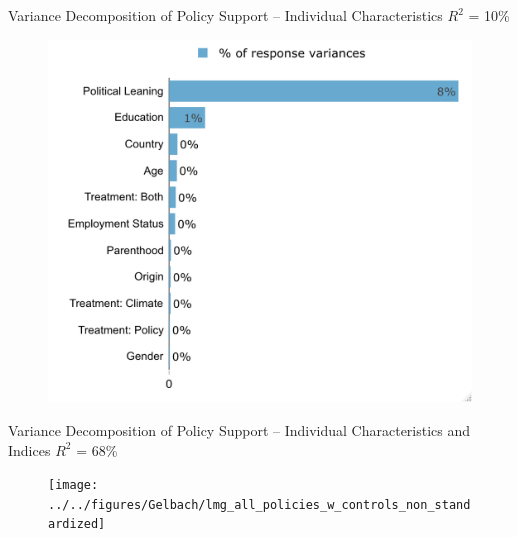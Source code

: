 \begin{frame}{Variance Decomposition of Policy Support -- Individual Characteristics}%
\vspace{-.1cm}
{\footnotesize $R^2$ = 10\%}
\begin{figure}[h!]
\vspace{-.1cm}
\includegraphics[width=.64\textwidth]{../../figures/Gelbach/lmg_all_policies_no_indices_non_standardized} \\
\end{figure}
\end{frame}

\begin{frame}{Variance Decomposition of Policy Support -- Individual Characteristics and Indices}%
\vspace{-.1cm}
{\footnotesize $R^2$ = 68\%}
\begin{figure}[h!]
\vspace{-.15cm}
\texttt{[image: ../../figures/Gelbach/lmg\_all\_policies\_w\_controls\_non\_standardized]} \\
\end{figure}
\end{frame}


